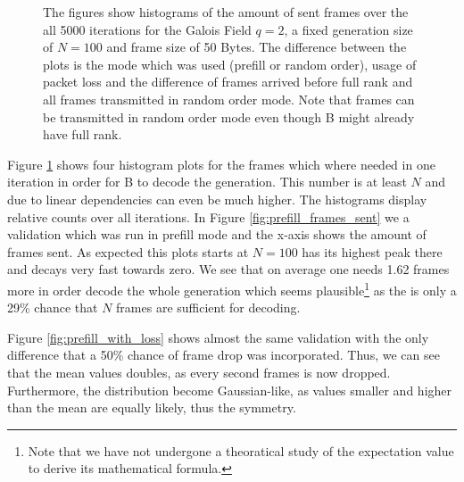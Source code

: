 \documentclass[a4paper,english,10pt]{tumarticle}
\begin{document}
\begin{figure}[htb]
  \hfill
  \caption{The figures show histograms of the amount of sent frames over the all 5000 iterations for the Galois Field $q=2$, a fixed generation size of $N=100$ and frame size of 50 Bytes. The difference between the plots is the mode which was used (prefill or random order), usage of packet loss and the difference of frames arrived before full rank and all frames transmitted in random order mode. Note that frames can be transmitted in random order mode even though B might already have full rank.}
  \label{fig:hists}
\end{figure}

Figure \ref{fig:hists} shows four histogram plots for the frames which where needed in one iteration
in order for B to decode the generation. This number is at least $N$ and due to linear dependencies
can even be much higher. The histograms display relative counts over all iterations. In Figure
\ref{fig:prefill_frames_sent} we a validation which was run in prefill mode and the x-axis shows the
amount of frames sent. As expected this plots starts at $N=100$ has its highest peak there and
decays very fast towards zero. We see that on average one needs 1.62 frames more in order decode the
whole generation which seems plausible\footnote{Note that we have not undergone a theoratical study
of the expectation value to derive its mathematical formula.} as the is only a 29\% chance that $N$
frames are sufficient for decoding. 

Figure \ref{fig:prefill_with_loss} shows almost the same validation with the only difference that a
50\% chance of frame drop was incorporated. Thus, we can see that the mean values doubles, as every
second frames is now dropped. Furthermore, the distribution become Gaussian-like, as values smaller
and higher than the mean are equally likely, thus the symmetry.
\end{document}
